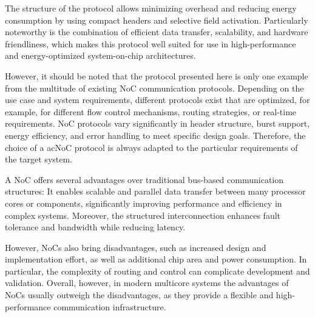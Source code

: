 The structure of the protocol allows minimizing overhead and reducing energy consumption by using compact headers and selective field activation. Particularly noteworthy is the combination of efficient data transfer, scalability, and hardware friendliness, which makes this protocol well suited for use in high-performance and energy-optimized system-on-chip architectures.

However, it should be noted that the protocol presented here is only one example from the multitude of existing \ac{NoC} communication protocols. Depending on the use case and system requirements, different protocols exist that are optimized, for example, for different flow control mechanisms, routing strategies, or real-time requirements. \ac{NoC} protocols vary significantly in header structure, burst support, energy efficiency, and error handling to meet specific design goals. Therefore, the choice of a ac{NoC} protocol is always adapted to the particular requirements of the target system.


A \ac{NoC} offers several advantages over traditional bus-based communication structures: It enables scalable and parallel data transfer between many processor cores or components, significantly improving performance and efficiency in complex systems. Moreover, the structured interconnection enhances fault tolerance and bandwidth while reducing latency.

However, \ac{NoC}s also bring disadvantages, such as increased design and implementation effort, as well as additional chip area and power consumption. In particular, the complexity of routing and control can complicate development and validation. Overall, however, in modern multicore systems the advantages of \ac{NoC}s usually outweigh the disadvantages, as they provide a flexible and high-performance communication infrastructure.\cite{dally_principles_2004}
